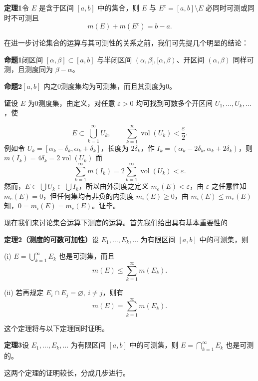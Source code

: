\noindent\textbf{定理1}\quad 令 $E$ 是含于区间 $[a,b]$ 中的集合，则 $E$ 与 $E^c=[a,b]\setminus E$ 必同时可测或同时不可测且
\[
 m(E)+m(E^c)=b-a.
\]

在进一步讨论集合的运算与其可测性的关系之前，我们可先提几个明显的结论：

\noindent\textbf{命题1}\quad 闭区间 $[\alpha,\beta]\subset[a,b]$ 与半闭区间 $(\alpha,\beta],[\alpha,\beta)$、开区间 $(\alpha,\beta)$ 同样可测，且测度同为 $\beta-\alpha$。

\noindent\textbf{命题2}\quad $[a,b]$ 内之0测度集均为可测集，而且其测度为0。

\begin{sloppypar}\noindent\textbf{证}\quad 设 $E$ 为0测度集，由定义，对任意 $\varepsilon>0$ 均可找到可数多个开区间 $U_1,\ldots,U_k,\ldots$，使\end{sloppypar}
\[
 E\subset\bigcup_{k=1}^{\infty}U_k,\qquad \sum_{k=1}^{\infty}\operatorname{vol}(U_k)<\frac\varepsilon2.
\]
例如令 $U_k=[\alpha_k-\delta_k,\alpha_k+\delta_k]$，长度为 $2\delta_k$，作 $I_k=(\alpha_k-2\delta_k,\alpha_k+2\delta_k)$，则 $m(I_k)=4\delta_k=2\operatorname{vol}(U_k)$ 而
\[
 \sum_{k=1}^{\infty}m(I_k)=2\sum_{k=1}^{\infty}\operatorname{vol}(U_k)<\varepsilon.
\]
然而，$E\subset\bigcup U_k\subset\bigcup I_k$，所以由外测度之定义 $m_e(E)<\varepsilon$，由 $\varepsilon$ 之任意性知 $m_e(E)=0$，但任何集均有非负的内测度 $m_i(E)\ge0$，由 $m_i(E)\le m_e(E)$ 知，$0=m_i(E)=m_e(E)$。证毕。

现在我们来讨论集合运算下测度的运算。首先我们给出具有基本重要性的

\noindent\textbf{定理2（测度的可数可加性）}\quad 设 $E_1,\ldots,E_k,\ldots$ 为有限区间 $[a,b]$ 中的可测集，则

(i) $E=\bigcup_{k=1}^{\infty}E_k$ 也是可测集，而且
\begin{equation}
 m(E)\le\sum_{k=1}^{\infty}m(E_k).
 \tag{8}
\end{equation}

(ii) 若再规定 $E_i\cap E_j=\varnothing,\ i\ne j$，则有
\begin{equation}
 m(E)=\sum_{k=1}^{\infty}m(E_k).
 \tag{9}
\end{equation}

这个定理将与以下定理同时证明。

\noindent\textbf{定理3}\quad 设 $E_1,\ldots,E_k,\ldots$ 为有限区间 $[a,b]$ 中的可测集，则 $E=\bigcap_{k=1}^{\infty}E_k$ 也是可测的。

这两个定理的证明较长，分成几步进行。

